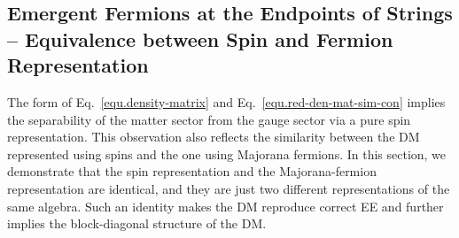 \subsection{Emergent Fermions at the Endpoints of Strings -- Equivalence between Spin and Fermion Representation}\label{sec:Emergent-Fermions-at-the-Endpoints}


The form of Eq.~\eqref{equ.density-matrix} and Eq.~\eqref{equ.red-den-mat-sim-con} implies the separability of the matter sector from the gauge sector via a pure spin representation. This observation also reflects the similarity between the DM represented using spins and the one using Majorana fermions. In this section, we demonstrate that the spin representation and the Majorana-fermion representation are identical, and they are just two different representations of the same algebra. Such an identity makes the DM reproduce correct EE and further implies the block-diagonal structure of the DM.

